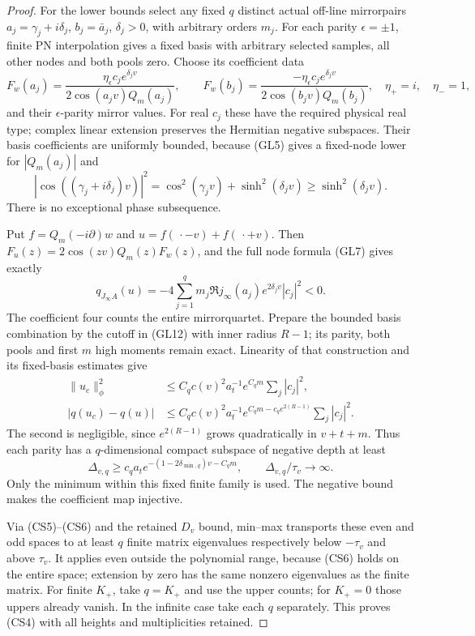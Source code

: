 \documentclass[11pt]{article}
\theoremstyle{remark}\newtheorem{remark}[theorem]{Remark}
\begin{document}
\begin{proof}
For the lower bounds select any fixed \(q\) distinct actual
off-line mirrorpairs \(a_j=\gamma_j+i\delta_j\), \(b_j=\bar a_j\),
\(\delta_j>0\), with arbitrary orders \(m_j\).
For each parity \(\epsilon=\pm1\), finite PN interpolation gives
a fixed basis with arbitrary selected samples, all other nodes
and both pools zero. Choose its coefficient data
\[
 F_w(a_j)=
 \frac{\eta_\epsilon c_j e^{\delta_jv}}
      {2\cos(a_jv)Q_m(a_j)},\qquad
 F_w(b_j)=
 \frac{-\eta_\epsilon c_j e^{\delta_jv}}
      {2\cos(b_jv)Q_m(b_j)},\quad
 \eta_+=i,\quad\eta_-=1,                            \tag{CS7}
\]
and their \(\epsilon\)-parity mirror values.
For real \(c_j\) these have the required physical real type;
complex linear extension preserves the Hermitian negative
subspaces. Their basis coefficients are uniformly bounded,
because (GL5) gives a fixed-node lower for \(|Q_m(a_j)|\) and
\[
 |\cos((\gamma_j+i\delta_j)v)|^2
   =\cos^2(\gamma_jv)+\sinh^2(\delta_jv)
                         \ge\sinh^2(\delta_jv).       \tag{CS8}
\]
There is no exceptional phase subsequence.

Put \(f=Q_m(-i\partial)w\) and \(u=f(\,\cdot-v)+f(\,\cdot+v)\).
Then \(F_u(z)=2\cos(zv)Q_m(z)F_w(z)\), and the full node formula
(GL7) gives exactly
\[
 q_{J_\infty A}(u)=
       -4\sum_{j=1}^q m_j\Re j_\infty(a_j)
                         e^{2\delta_jv}|c_j|^2<0.    \tag{CS9}
\]
The coefficient four counts the entire mirrorquartet.
Prepare the bounded basis combination by the cutoff in
(GL12) with inner radius \(R-1\); its parity, both pools and
first \(m\) high moments remain exact. Linearity of that
construction and its fixed-basis estimates give
\[
 \begin{split}
 \|u_c\|_\phi^2
   &\le C_qc(v)^2a_t^{-1}e^{C_qm}\sum_j|c_j|^2,\\
 |q(u_c)-q(u)|
   &\le C_qc(v)^2a_t^{-1}
         e^{C_qm-c_qe^{2(R-1)}}\sum_j|c_j|^2.
 \end{split}                                                   \tag{CS10}
\]
The second is negligible, since \(e^{2(R-1)}\) grows quadratically
in \(v+t+m\). Thus each parity has a \(q\)-dimensional compact
subspace of negative depth at least
\[
 \Delta_{v,q}\ge c_q a_t
       e^{-(1-2\delta_{\min,q})v-C_qm},\qquad
                       \Delta_{v,q}/\tau_v\longrightarrow\infty.
                                                               \tag{CS11}
\]
Only the minimum within this fixed finite family is used.
The negative bound makes the coefficient map injective.

Via (CS5)--(CS6) and the retained \(D_v\) bound, min--max
transports these even and odd spaces to at least \(q\) finite
matrix eigenvalues respectively below \(-\tau_v\) and above
\(\tau_v\). It applies even outside the polynomial range,
because (CS6) holds on the entire space; extension by zero
has the same nonzero eigenvalues as the finite matrix.
For finite \(K_+\), take \(q=K_+\) and use the upper counts;
for \(K_+=0\) those uppers already vanish. In the infinite
case take each \(q\) separately. This proves (CS4) with all
heights and multiplicities retained.
\end{proof}
\end{document}
